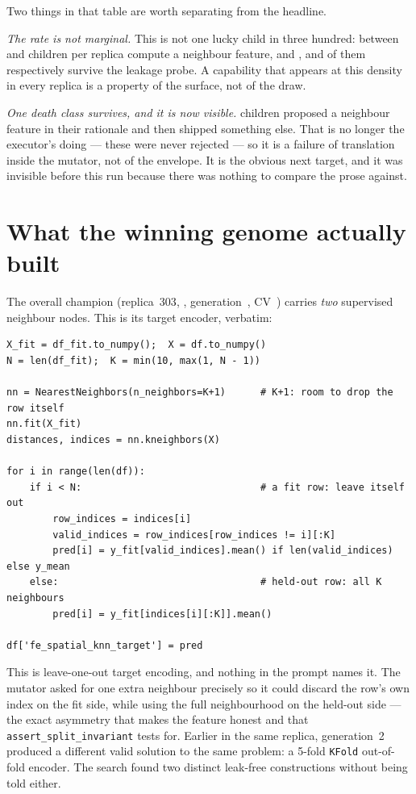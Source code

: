 \documentclass[11pt]{article}
\newcommand{\rC}{\textcolor{good}{replica~303}}
\begin{document}
\noindent
Two things in that table are worth separating from the headline.

\emph{The rate is not marginal.} This is not one lucky child in three hundred: between
\rBNbrBuilt{} and \rCNbrBuilt{} children per replica compute a neighbour feature, and
\rANbrValid{}, \rBNbrValid{} and \rCNbrValid{} of them respectively survive the leakage
probe. A capability that appears at this density in every replica is a property of the
surface, not of the draw.

\emph{One death class survives, and it is now visible.} \allNbrMentionOnly{} children
proposed a neighbour feature in their rationale and then shipped something else. That is no
longer the executor's doing --- these were never rejected --- so it is a failure of
translation inside the mutator, not of the envelope. It is the obvious next target, and it
was invisible before this run because there was nothing to compare the prose against.

\section{What the winning genome actually built}

The overall champion (\rC{}, \texttt{\rCBestId}, generation~\rCBestGen{}, CV~\rCBestCV{})
carries \emph{two} supervised neighbour nodes. This is its target encoder, verbatim:

\begin{lstlisting}
X_fit = df_fit.to_numpy();  X = df.to_numpy()
N = len(df_fit);  K = min(10, max(1, N - 1))

nn = NearestNeighbors(n_neighbors=K+1)      # K+1: room to drop the row itself
nn.fit(X_fit)
distances, indices = nn.kneighbors(X)

for i in range(len(df)):
    if i < N:                               # a fit row: leave itself out
        row_indices = indices[i]
        valid_indices = row_indices[row_indices != i][:K]
        pred[i] = y_fit[valid_indices].mean() if len(valid_indices) else y_mean
    else:                                   # held-out row: all K neighbours
        pred[i] = y_fit[indices[i][:K]].mean()

df['fe_spatial_knn_target'] = pred
\end{lstlisting}

\noindent
This is leave-one-out target encoding, and nothing in the prompt names it. The mutator asked
for one extra neighbour precisely so it could discard the row's own index on the fit side,
while using the full neighbourhood on the held-out side --- the exact asymmetry that makes
the feature honest and that \texttt{assert\_split\_invariant} tests for. Earlier in the same
replica, generation~2 produced a different valid solution to the same problem: a 5-fold
\texttt{KFold} out-of-fold encoder. The search found two distinct leak-free constructions
without being told either.
\end{document}
